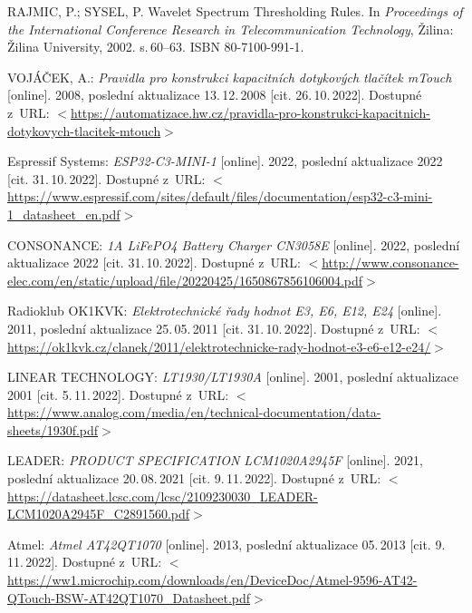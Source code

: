 \begin{thebibliography}{99}
    RAJMIC, P.; SYSEL, P.
    Wavelet Spectrum Thresholding Rules.
    In \emph{Proceedings of the International Conference Research in Telecommunication Technology},
    Žilina: Žilina University, 2002. s.\,60--63. ISBN 80-7100-991-1.

    VOJÁČEK, A.:
    \emph{Pravidla pro konstrukci kapacitních dotykových tlačítek mTouch}\/ [online].
    2008, poslední aktualizace 13.\,12.\,2008 [cit. 26.\,10.\,2022].
    Dostupné z~URL:
    \(<\)\url{https://automatizace.hw.cz/pravidla-pro-konstrukci-kapacitnich-dotykovych-tlacitek-mtouch}\(>\)

    Espressif Systems:
    \emph{ESP32-C3-MINI-1}\/ [online].
    2022, poslední aktualizace 2022 [cit. 31.\,10.\,2022].
    Dostupné z~URL:
    \(<\)\url{https://www.espressif.com/sites/default/files/documentation/esp32-c3-mini-1_datasheet_en.pdf}\(>\)

    CONSONANCE:
    \emph{1A LiFePO4 Battery Charger CN3058E}\/ [online].
    2022, poslední aktualizace 2022 [cit. 31.\,10.\,2022].
    Dostupné z~URL: %
    \(<\)\url{http://www.consonance-elec.com/en/static/upload/file/20220425/1650867856106004.pdf}\(>\)

    Radioklub OK1KVK:
    \emph{Elektrotechnické řady hodnot E3, E6, E12, E24}\/ [online].
    2011, poslední aktualizace 25.\,05.\,2011 [cit. 31.\,10.\,2022].
    Dostupné z~URL: 
    \(<\)\url{https://ok1kvk.cz/clanek/2011/elektrotechnicke-rady-hodnot-e3-e6-e12-e24/}\(>\)

    LINEAR TECHNOLOGY:
    \emph{LT1930/LT1930A}\/ [online].
    2001, poslední aktualizace 2001 [cit. 5.\,11.\,2022].
    Dostupné z~URL: 
    \(<\)\url{https://www.analog.com/media/en/technical-documentation/data-sheets/1930f.pdf}\(>\)

    LEADER:
    \emph{PRODUCT SPECIFICATION LCM1020A2945F}\/ [online].
    2021, poslední aktualizace 20.\,08.\,2021 [cit. 9.\,11.\,2022].
    Dostupné z~URL: 
    \(<\)\url{https://datasheet.lcsc.com/lcsc/2109230030_LEADER-LCM1020A2945F_C2891560.pdf}\(>\)

    Atmel:
    \emph{Atmel AT42QT1070}\/ [online].
    2013, poslední aktualizace 05.\,2013 [cit. 9.\,11.\,2022].
    Dostupné z~URL: 
    \(<\)\url{https://ww1.microchip.com/downloads/en/DeviceDoc/Atmel-9596-AT42-QTouch-BSW-AT42QT1070_Datasheet.pdf}\(>\)


\end{thebibliography}
